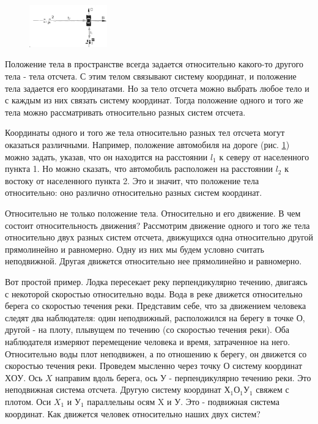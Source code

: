 \documentclass[a6paper, 11pt]{diss_4}
\renewcommand{\'}{\,'}
\begin{document}
\begin{figure}
\includegraphics[width=0.3\textwidth]{img/img_08.eps}
\caption{}
\label{fig8}
\end{figure}

 Положение тела в пространстве всегда задается относительно какого-то другого
тела - тела отсчета. С этим телом связывают систему координат, и положение тела
задается его координатами. Но за тело отсчета можно выбрать любое тело и с
каждым из них связать систему координат. Тогда положение одного и того же тела
можно рассматривать относительно разных систем отсчета.

  Координаты одного и того же тела относительно разных тел отсчета могут
оказаться различными. Например, положение автомобиля на дороге (рис. \ref{fig8}) можно
задать, указав, что он находится на расстоянии $l_1$ к северу от населенного
пункта 1. Но можно сказать, что автомобиль расположен на расстоянии $l_2$ к
востоку от населенного пункта 2. Это и значит, что положение тела относительно:
оно различно относительно разных систем координат.

  Относительно не только положение тела. Относительно и его движение. В чем
состоит относительность движения? Рассмотрим движение одного и того же тела
относительно двух разных систем отсчета, движущихся одна относительно другой
прямолинейно и равномерно. Одну из них мы будем условно считать неподвижной.
Другая движется относительно нее прямолинейно и равномерно.

  Вот простой пример. Лодка пересекает реку перпендикулярно течению, двигаясь с
 некоторой скоростью относительно воды. Вода в реке движется относительно
берега со скоростью течения реки. Представим себе, что за движением человека
следят два наблюдателя: один неподвижный, расположился на берегу в точке $О$,
другой - на плоту, плывущем по течению (со скоростью течения реки). Оба
наблюдателя измеряют перемещение человека и время, затраченное на него.
Относительно воды плот неподвижен, а по отношению к берегу, он движется со
скоростью течения реки. Проведем мысленно через точку $О$ систему координат
$ХОУ$. Ось $X$ направим вдоль берега, ось $У$ - перпендикулярно течению реки.
Это неподвижная система отсчета. Другую систему координат $Х_1 О_1 У_1$
свяжем с плотом. Оси $X_1$ и $У_1$ параллельны осям X и У. Это - подвижная
система координат. Как движется человек относительно наших двух систем?
\end{document}

